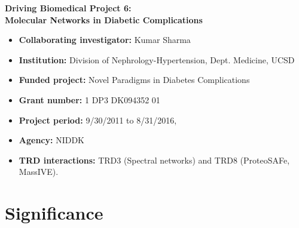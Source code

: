 \documentclass[arial,11pt]{article}
\begin{document}
\begin{center}
\Large
{\bf Driving Biomedical Project 6:\\Molecular Networks in Diabetic Complications}
\normalsize
\end{center}

\begin{itemize}
\item {\bf Collaborating investigator:}  Kumar Sharma
\item {\bf Institution:} Division of Nephrology-Hypertension, Dept. Medicine, UCSD
\item {\bf Funded project:} 	Novel Paradigms in Diabetes Complications
\item {\bf Grant number:} 	1 DP3 DK094352 01   	
\item {\bf Project period:}   9/30/2011 to 8/31/2016,
\item {\bf Agency:}  NIDDK
\item {\bf TRD interactions:}  TRD3 (Spectral networks) and TRD8 (ProteoSAFe, MassIVE).
\end{itemize}

\section{Significance}

\end{document}
